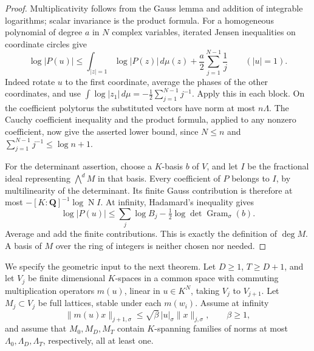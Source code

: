 \begin{proof}
Multiplicativity follows from the Gauss lemma and addition of
integrable logarithms; scalar invariance is the product formula.
For a homogeneous polynomial of degree $a$ in $N$ complex variables,
iterated Jensen inequalities on coordinate circles give
\[
 \log|P(u)|\leq\int_{|z|=1}\log|P(z)|\,d\mu(z)
                    +\frac a2\sum_{j=1}^{N-1}\frac1j
                 \qquad(|u|=1).
\]
Indeed rotate $u$ to the first coordinate, average the phases of the
other coordinates, and use
$\int\log|z_1|\,d\mu=-\frac12\sum_{j=1}^{N-1}j^{-1}$.
Apply this in each block.  On the coefficient polytorus the substituted
vectors have norm at most $n\Lambda$.  The Cauchy coefficient inequality
and the product formula, applied to any nonzero coefficient, now give
the asserted lower bound, since $N\leq n$ and
$\sum_{j=1}^{N-1}j^{-1}\leq\log n+1$.

For the determinant assertion, choose a $K$-basis $b$ of $V$, and let
$I$ be the fractional ideal representing $\bigwedge^dM$ in that basis.
Every coefficient of $P$ belongs to $I$, by multilinearity of the
determinant.  Its finite Gauss contribution is therefore at most
$-[K:\mathbf Q]^{-1}\log\operatorname{N}I$.
At infinity, Hadamard's inequality gives
\[
 \log|P(u)|\leq\sum_j\log B_j
                   -\tfrac12\log\det\operatorname{Gram}_\sigma(b).
\]
Average and add the finite contributions.  This is exactly the
definition of $\widehat{\deg}M$.  A basis of $M$ over the ring of
integers is neither chosen nor needed.
\end{proof}

We specify the geometric input to the next theorem.  Let $D\geq1$,
$T\geq D+1$, and let $V_j$ be finite dimensional $K$-spaces in a
common space with commuting multiplication operators $m(u)$, linear
in $u\in K^N$, taking $V_j$ to $V_{j+1}$.  Let $M_j\subset V_j$
be full lattices, stable under each $m(w_i)$.  Assume at infinity
\[
 \|m(u)x\|_{j+1,\sigma}\leq\sqrt\beta\,|u|_\sigma\|x\|_{j,\sigma},
                  \qquad\beta\geq1,
\]
and assume that $M_0,M_D,M_T$ contain $K$-spanning families of norms
at most $\Lambda_0,\Lambda_D,\Lambda_T$, respectively, all at least one.


